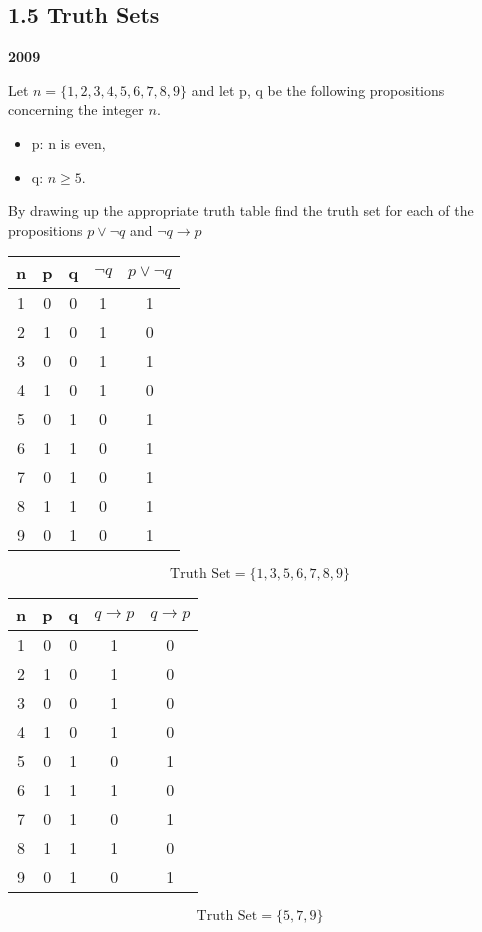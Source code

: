 \subsection*{1.5 Truth Sets}
\textbf{2009} 

Let $n = \{1, 2,3,4, 5,6,7, 8, 9\}$ and let p, q be the following propositions concerning the integer $n$.
\begin{itemize}
\item p: n is even, 
\item q: $n\geq 5$.
\end{itemize}
By drawing up the appropriate truth table ﬁnd the truth set for each of the
propositions $p \vee \neg q$ and $ \neg q \rightarrow p$

\begin{tabular}{|c|c|c|c|c|}
\hline n & p & q & $\neg q$ & $p \vee \neg q$ \\ 
\hline 1 & 0 & 0 & 1 & 1\\ 
\hline 2 & 1 & 0 & 1 & 0\\ 
\hline 3 & 0 & 0 & 1 & 1\\ 
\hline 4 & 1 & 0 & 1 & 0\\ 
\hline 5 & 0 & 1 & 0 & 1\\ 
\hline 6 & 1 & 1 & 0 & 1\\ 
\hline 7 & 0 & 1 & 0 & 1\\ 
\hline 8 & 1 & 1 & 0 & 1\\ 
\hline 9 & 0 & 1 & 0 & 1\\ 
\hline 
\end{tabular} 
\[\mbox{Truth Set} = \{1,3,5,6,7,8,9\}\]

\begin{tabular}{|c|c|c|c|c|}
\hline n & p & q & $  q \rightarrow p$ & $  q \rightarrow p$ \\ 
\hline 1 & 0 & 0 & 1 & 0\\ 
\hline 2 & 1 & 0 & 1 & 0\\ 
\hline 3 & 0 & 0 & 1 & 0\\ 
\hline 4 & 1 & 0 & 1 & 0\\ 
\hline 5 & 0 & 1 & 0 & 1\\ 
\hline 6 & 1 & 1 & 1 & 0\\ 
\hline 7 & 0 & 1 & 0 & 1\\ 
\hline 8 & 1 & 1 & 1 & 0\\ 
\hline 9 & 0 & 1 & 0 & 1\\ 
\hline 
\end{tabular} 
\[\mbox{Truth Set} = \{5,7,9\}\]

